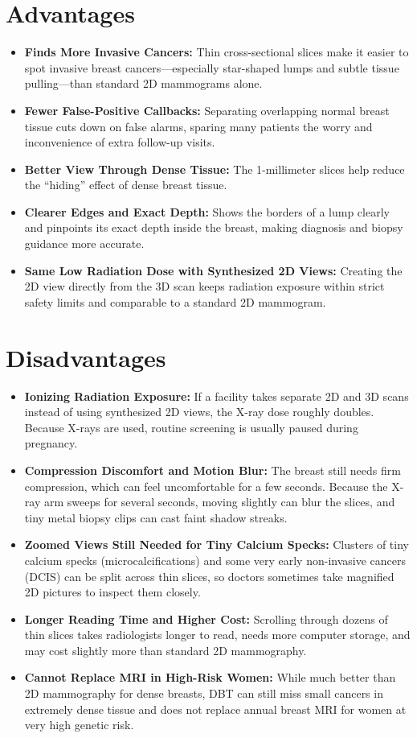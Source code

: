 \section{Advantages}
\begin{itemize}
\item \textbf{Finds More Invasive Cancers:} Thin cross-sectional slices make it easier to spot invasive breast cancers---especially star-shaped lumps and subtle tissue pulling---than standard 2D mammograms alone.
\item \textbf{Fewer False-Positive Callbacks:} Separating overlapping normal breast tissue cuts down on false alarms, sparing many patients the worry and inconvenience of extra follow-up visits.
\item \textbf{Better View Through Dense Tissue:} The 1-millimeter slices help reduce the ``hiding'' effect of dense breast tissue.
\item \textbf{Clearer Edges and Exact Depth:} Shows the borders of a lump clearly and pinpoints its exact depth inside the breast, making diagnosis and biopsy guidance more accurate.
\item \textbf{Same Low Radiation Dose with Synthesized 2D Views:} Creating the 2D view directly from the 3D scan keeps radiation exposure within strict safety limits and comparable to a standard 2D mammogram.
\end{itemize}

\section{Disadvantages}
\begin{itemize}
\item \textbf{Ionizing Radiation Exposure:} If a facility takes separate 2D and 3D scans instead of using synthesized 2D views, the X-ray dose roughly doubles. Because X-rays are used, routine screening is usually paused during pregnancy.
\item \textbf{Compression Discomfort and Motion Blur:} The breast still needs firm compression, which can feel uncomfortable for a few seconds. Because the X-ray arm sweeps for several seconds, moving slightly can blur the slices, and tiny metal biopsy clips can cast faint shadow streaks.
\item \textbf{Zoomed Views Still Needed for Tiny Calcium Specks:} Clusters of tiny calcium specks (microcalcifications) and some very early non-invasive cancers (DCIS) can be split across thin slices, so doctors sometimes take magnified 2D pictures to inspect them closely.
\item \textbf{Longer Reading Time and Higher Cost:} Scrolling through dozens of thin slices takes radiologists longer to read, needs more computer storage, and may cost slightly more than standard 2D mammography.
\item \textbf{Cannot Replace MRI in High-Risk Women:} While much better than 2D mammography for dense breasts, DBT can still miss small cancers in extremely dense tissue and does not replace annual breast MRI for women at very high genetic risk.
\end{itemize}

